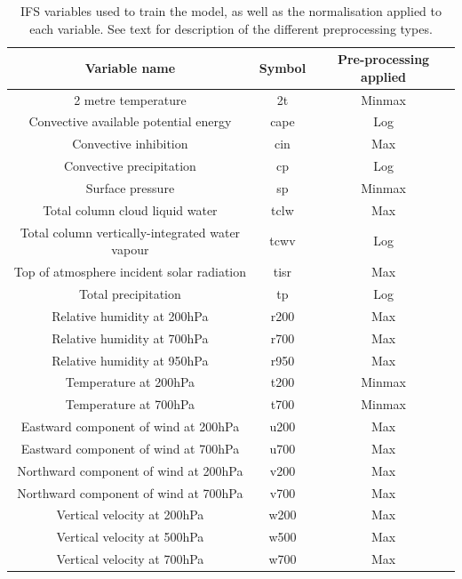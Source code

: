 \documentclass{article}
\begin{document}
\begin{table}[ht!]
\centering
\begin{tabular}{c | c | c } 
 \hline
 Variable name & Symbol & Pre-processing applied \\ [0.5ex] 
 \hline\hline
 2 metre temperature &2t & Minmax  \\
 Convective available potential energy &cape & Log \\
 Convective inhibition &cin & Max \\
Convective precipitation &cp & Log \\
Surface pressure & sp & Minmax  \\
Total column cloud liquid water &tclw & Max \\
Total column vertically-integrated water vapour&tcwv & Log \\
Top of atmosphere incident solar radiation&tisr & Max \\
Total precipitation &tp & Log \\
Relative humidity at 200hPa  &r200 & Max \\
Relative humidity at 700hPa  &r700 & Max \\
Relative humidity at 950hPa  &r950 & Max \\
Temperature at 200hPa &t200 & Minmax \\
Temperature at 700hPa  &t700 & Minmax \\
Eastward component of wind at 200hPa &u200 & Max \\
Eastward component of wind at 700hPa &u700 & Max \\
Northward component of wind at 200hPa&v200 & Max \\
Northward component of wind at 700hPa &v700 & Max \\
Vertical velocity at 200hPa &w200 & Max \\
Vertical velocity at 500hPa &w500 & Max \\
Vertical velocity at 700hPa &w700 & Max \\
 \hline
\end{tabular}

\caption{IFS variables used to train the model, as well as the normalisation applied to each variable. See text for description of the different preprocessing types.}
\label{tab:vars}
\end{table}
\end{document}
